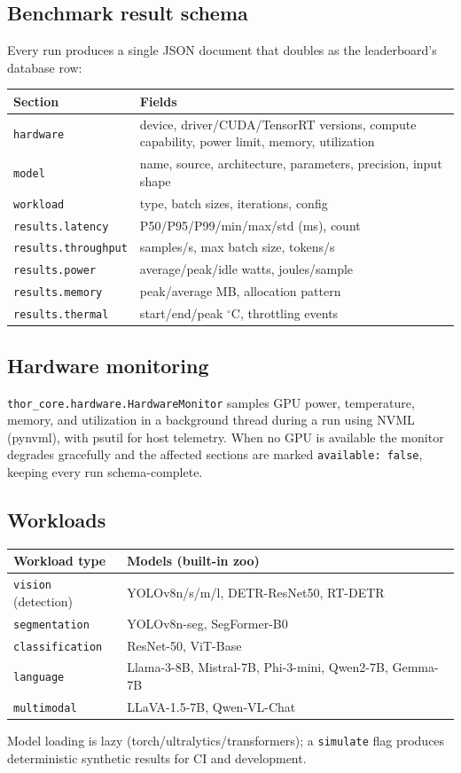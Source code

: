 \documentclass[11pt]{article}
\begin{document}
\subsection{Benchmark result schema}
Every run produces a single JSON document that doubles as the
leaderboard's database row:
\begin{center}
\begin{tabular}{ll}
\toprule
Section & Fields \\
\midrule
\texttt{hardware} & device, driver/CUDA/TensorRT versions, compute
capability, power limit, memory, utilization \\
\texttt{model} & name, source, architecture, parameters, precision,
input shape \\
\texttt{workload} & type, batch sizes, iterations, config \\
\texttt{results.latency} & P50/P95/P99/min/max/std (ms), count \\
\texttt{results.throughput} & samples/s, max batch size, tokens/s \\
\texttt{results.power} & average/peak/idle watts, joules/sample \\
\texttt{results.memory} & peak/average MB, allocation pattern \\
\texttt{results.thermal} & start/end/peak $^\circ$C, throttling events \\
\bottomrule
\end{tabular}
\end{center}

\subsection{Hardware monitoring}
\texttt{thor\_core.hardware.HardwareMonitor} samples GPU power,
temperature, memory, and utilization in a background thread during a
run using NVML (pynvml), with psutil for host telemetry. When no GPU
is available the monitor degrades gracefully and the affected sections
are marked \texttt{available: false}, keeping every run
schema-complete.

\subsection{Workloads}
\begin{center}
\begin{tabular}{ll}
\toprule
Workload type & Models (built-in zoo) \\
\midrule
\texttt{vision} (detection) & YOLOv8n/s/m/l, DETR-ResNet50, RT-DETR \\
\texttt{segmentation} & YOLOv8n-seg, SegFormer-B0 \\
\texttt{classification} & ResNet-50, ViT-Base \\
\texttt{language} & Llama-3-8B, Mistral-7B, Phi-3-mini, Qwen2-7B,
Gemma-7B \\
\texttt{multimodal} & LLaVA-1.5-7B, Qwen-VL-Chat \\
\bottomrule
\end{tabular}
\end{center}
Model loading is lazy (torch/ultralytics/transformers); a
\texttt{simulate} flag produces deterministic synthetic results for CI
and development.
\end{document}
